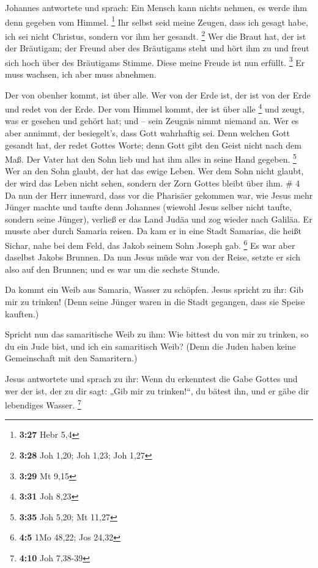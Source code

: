  Johannes antwortete und sprach: Ein Mensch kann nichts
nehmen, es werde ihm denn gegeben vom Himmel. \footnote{\textbf{3:27}
  Hebr 5,4}  Ihr selbst seid meine Zeugen, dass ich gesagt
habe, ich sei nicht Christus, sondern vor ihm her gesandt. \footnote{\textbf{3:28}
  Joh 1,20; Joh 1,23; Joh 1,27}  Wer die Braut hat, der ist
der Bräutigam; der Freund aber des Bräutigams steht und hört ihm zu und
freut sich hoch über des Bräutigams Stimme. Diese meine Freude ist nun
erfüllt. \footnote{\textbf{3:29} Mt 9,15}  Er muss wachsen,
ich aber muss abnehmen.

 Der von obenher kommt, ist über alle. Wer von der Erde
ist, der ist von der Erde und redet von der Erde. Der vom Himmel kommt,
der ist über alle \footnote{\textbf{3:31} Joh 8,23}  und
zeugt, was er gesehen und gehört hat; und -- sein Zeugnis nimmt niemand
an.  Wer es aber annimmt, der besiegelt's, dass Gott
wahrhaftig sei.  Denn welchen Gott gesandt hat, der redet
Gottes Worte; denn Gott gibt den Geist nicht nach dem Maß. 
Der Vater hat den Sohn lieb und hat ihm alles in seine Hand gegeben.
\footnote{\textbf{3:35} Joh 5,20; Mt 11,27}  Wer an den
Sohn glaubt, der hat das ewige Leben. Wer dem Sohn nicht glaubt, der
wird das Leben nicht sehen, sondern der Zorn Gottes bleibt über ihm. \#
4  Da nun der Herr inneward, dass vor die Pharisäer gekommen
war, wie Jesus mehr Jünger machte und taufte denn Johannes 
(wiewohl Jesus selber nicht taufte, sondern seine Jünger), 
verließ er das Land Judäa und zog wieder nach Galiläa.  Er
musste aber durch Samaria reisen.  Da kam er in eine Stadt
Samarias, die heißt Sichar, nahe bei dem Feld, das Jakob seinem Sohn
Joseph gab. \footnote{\textbf{4:5} 1Mo 48,22; Jos 24,32}  Es
war aber daselbst Jakobs Brunnen. Da nun Jesus müde war von der Reise,
setzte er sich also auf den Brunnen; und es war um die sechste Stunde.

 Da kommt ein Weib aus Samaria, Wasser zu schöpfen. Jesus
spricht zu ihr: Gib mir zu trinken!  (Denn seine Jünger
waren in die Stadt gegangen, dass sie Speise kauften.)

 Spricht nun das samaritische Weib zu ihm: Wie bittest du
von mir zu trinken, so du ein Jude bist, und ich ein samaritisch Weib?
(Denn die Juden haben keine Gemeinschaft mit den Samaritern.)

 Jesus antwortete und sprach zu ihr: Wenn du erkenntest die
Gabe Gottes und wer der ist, der zu dir sagt: „Gib mir zu trinken!{}``,
du bätest ihn, und er gäbe dir lebendiges Wasser. \footnote{\textbf{4:10}
  Joh 7,38-39}

